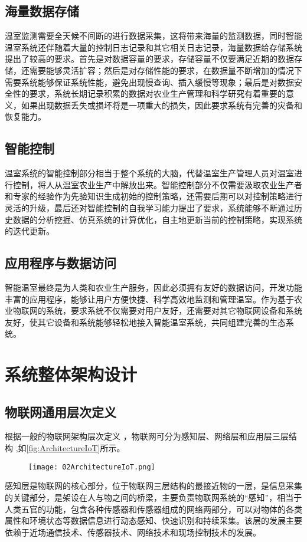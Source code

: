	\subsection{海量数据存储}
温室监测需要全天候不间断的进行数据采集，这将带来海量的监测数据，同时智能温室系统还伴随着大量的控制日志记录和其它相关日志记录，海量数据给存储系统提出了较高的要求。首先是对数据容量的要求，存储容量不仅要满足近期的数据存储，还需要能够灵活扩容；然后是对存储性能的要求，在数据量不断增加的情况下需要系统能够保证系统性能，避免出现慢查询、插入缓慢等现象；最后是对数据安全性的要求，系统长期记录积累的数据对农业生产管理和科学研究有着重要的意义，如果出现数据丢失或损坏将是一项重大的损失，因此要求系统有完善的灾备和恢复能力。
	\subsection{智能控制}
温室系统的智能控制部分相当于整个系统的大脑，代替温室生产管理人员对温室进行控制，将人从温室农业生产中解放出来。智能控制部分不仅需要汲取农业生产者和专家的经验作为先验知识生成初始的控制策略，还需要后期可以对控制策略进行灵活的升级，最后还对智能控制的自我学习能力提出了要求，系统能够不断通过历史数据的分析挖掘、仿真系统的计算优化，自主地更新当前的控制策略，实现系统的迭代更新。
	\subsection{应用程序与数据访问}
智能温室最终是为人类和农业生产服务，因此必须拥有友好的数据访问，开发功能丰富的应用程序，能够让用户方便快捷、科学高效地监测和管理温室。作为基于农业物联网的系统，要求系统不仅需要对用户友好，还需要对其它物联网设备和系统友好，使其它设备和系统能够轻松地接入智能温室系统，共同组建完善的生态系统。


\section{系统整体架构设计}
	\subsection{物联网通用层次定义}
	根据一般的物联网架构层次定义\supercite{Yu2011,LiuQiang2010} ，物联网可分为感知层、网络层和应用层三层结构\supercite{HanYi2016A,WangHuaiyu2015} ,如\ref{fig:ArchitectureIoT}所示。
	\begin{figure}[!htp]
  		\centering
 		\texttt{[image: 02ArchitectureIoT.png]}
	\end{figure}
	感知层是物联网的核心部分，位于物联网三层结构的最接近物的一层，是信息采集的关键部分，是架设在人与物之间的桥梁，主要负责物联网系统的“感知”，相当于人类五官的功能，包含各种传感器和传感器组成的网络两部分，可以对物体的各类属性和环境状态等数据信息进行动态感知、快速识别和持续采集。该层的发展主要依赖于近场通信技术、传感器技术、网络技术和现场控制技术的发展。
	
